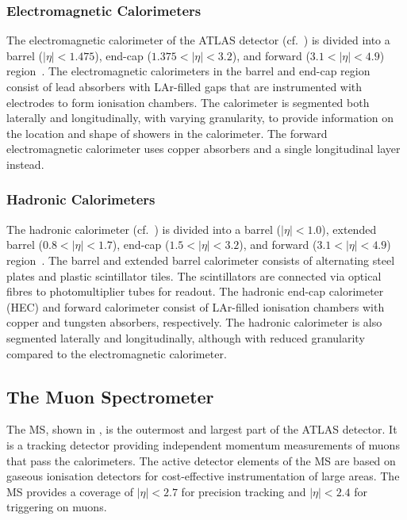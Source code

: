 \subsubsection{Electromagnetic Calorimeters}

The electromagnetic calorimeter of the ATLAS detector (cf.\
) is divided into a barrel ($|\eta| < 1.475$),
end-cap ($1.375 < |\eta| < 3.2$), and forward ($3.1 < |\eta| < 4.9$)
region~\cite{PERF-2007-01}. The electromagnetic calorimeters in the barrel and
end-cap region consist of lead absorbers with LAr-filled gaps that are
instrumented with electrodes to form ionisation chambers. The calorimeter is
segmented both laterally and longitudinally, with varying granularity, to
provide information on the location and shape of showers in the calorimeter. The
forward electromagnetic calorimeter uses copper absorbers and a single
longitudinal layer instead.


\subsubsection{Hadronic Calorimeters}

The hadronic calorimeter (cf.\ ) is divided into a
barrel ($|\eta| < 1.0$), extended barrel ($0.8 < |\eta| < 1.7$), end-cap
($1.5 < |\eta| < 3.2$), and forward ($3.1 < |\eta| < 4.9$)
region~\cite{PERF-2007-01}.  The barrel and extended barrel calorimeter consists
of alternating steel plates and plastic scintillator tiles. The scintillators
are connected via optical fibres to photomultiplier tubes for readout. The
hadronic end-cap calorimeter (HEC) and forward calorimeter consist of LAr-filled
ionisation chambers with copper and tungsten absorbers, respectively. The
hadronic calorimeter is also segmented laterally and longitudinally, although
with reduced granularity compared to the electromagnetic calorimeter.


\subsection{The Muon Spectrometer}%
\label{sec:atlas_ms}

The MS, shown in , is the outermost and largest part
of the ATLAS detector. It is a tracking detector providing independent momentum
measurements of muons that pass the calorimeters. The active detector elements
of the MS are based on gaseous ionisation detectors for cost-effective
instrumentation of large areas. The MS provides a coverage of $|\eta| < 2.7$ for
precision tracking and $|\eta| < 2.4$ for triggering on muons.

